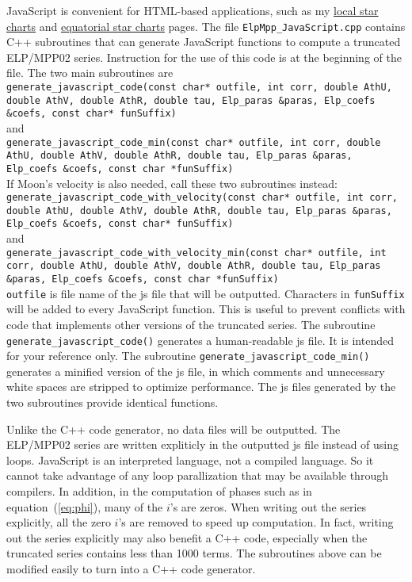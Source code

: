 \documentclass[12pt]{article}
\begin{document}
JavaScript is convenient for HTML-based applications, such as my
\href{https://ytliu0.github.io/starCharts/}{local star charts} and 
\href{https://ytliu0.github.io/starCharts/chartGCRS_min.html}{equatorial star 
charts} pages. The file 
{\tt ElpMpp\_JavaScript.cpp} contains C++ subroutines that can 
generate JavaScript functions to compute a truncated ELP/MPP02 series. 
Instruction for the use of this code is at the beginning of the file. 
The two main subroutines are \\
{\tt generate\_javascript\_code(const char* outfile, int corr,
                       double AthU, double AthV, double AthR, double tau,
                       Elp\_paras \&paras, Elp\_coefs \&coefs, const char* funSuffix)} \\
and \\
{\tt generate\_javascript\_code\_min(const char* outfile, int corr,
                       double AthU, double AthV, double AthR, double tau,
                       Elp\_paras \&paras, Elp\_coefs \&coefs, const char *funSuffix)}\\
If Moon's velocity is also needed, call these two subroutines instead:\\
{\tt generate\_javascript\_code\_with\_velocity(const char* outfile, int corr,
                       double AthU, double AthV, double AthR, double tau,
                       Elp\_paras \&paras, Elp\_coefs \&coefs, const char* funSuffix)} \\
and \\
{\tt generate\_javascript\_code\_with\_velocity\_min(const char* outfile, int corr,
                       double AthU, double AthV, double AthR, double tau,
                       Elp\_paras \&paras, Elp\_coefs \&coefs, const char *funSuffix)}\\
{\tt outfile} is file name of the js file that will be outputted. 
Characters in {\tt funSuffix} will be added to every JavaScript function. 
This is useful to prevent conflicts with code that implements other versions 
of the truncated series. The subroutine {\tt generate\_javascript\_code()} 
generates a human-readable js file. It is intended for your reference only. The 
subroutine {\tt generate\_javascript\_code\_min()} generates a minified 
version of the js file, in which comments and unnecessary white spaces are 
stripped to optimize performance. The js files generated by the two subroutines 
provide identical functions. 

Unlike the C++ code generator, no data files will be outputted. The ELP/MPP02 
series are written expliticly in the outputted js file instead of using loops. 
JavaScript is an interpreted language, not a compiled language. So it cannot 
take advantage of any loop parallization that may be available through compilers.
In addition, in the computation of phases such as 
in equation~(\ref{eq:phi}), many of the $i$'s are zeros. When writing out the series 
explicitly, all the zero $i$'s are removed to speed up computation. In fact, 
writing out the series explicitly may also benefit a C++ code, especially when the 
truncated series contains less than 1000 terms. The subroutines above can be 
modified easily to turn into a C++ code generator.
\end{document}
